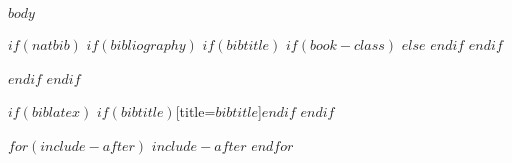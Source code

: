 \documentclass[a4paper, 12pt, twoside]{$thesis_class$}
\theoremstyle{plain}
\theoremstyle{definition}
\theoremstyle{remark}
\begin{document}
$body$


$if(natbib)$
$if(bibliography)$
$if(bibtitle)$
$if(book-class)$
\renewcommand\bibname{$bibtitle$}
$else$
\renewcommand\refname{$bibtitle$}
$endif$
$endif$

$endif$
$endif$

$if(biblatex)$
\printbibliography$if(bibtitle)$[title=$bibtitle$]$endif$
$endif$

$for(include-after)$
$include-after$
$endfor$
\end{document}
